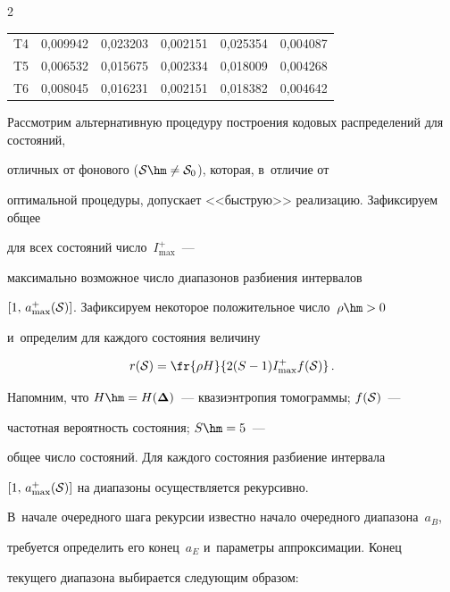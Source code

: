 \begin{multicols}{2}
\begin{table}
\begin{center}
\begin{tabular}{|c|c|c|c|c|c|}
T4 & 0,009942 & 0,023203 & 0,002151 & 0,025354 & 0,004087\\


T5 & 0,006532 & 0,015675 & 0,002334 & 0,018009 & 0,004268\\


T6 & 0,008045 & 0,016231 & 0,002151 & 0,018382 & 0,004642\\

\hline

\end{tabular}

\end{center}

\end{table}



Рассмотрим альтернативную процедуру построения кодовых распределений для состояний, 

отличных от фонового (${\cal S}\hm\neq {\cal S}_0$), которая, в~отличие от 

оптимальной процедуры, допускает <<быструю>> реализацию. Зафиксируем общее 

для всех со\-сто\-яний число~$I_{\max}^+$~--- 

максимально возможное число диапазонов разбиения интервалов 

$[1,\,a_{\max}^+({\cal S})]$. Зафиксируем некоторое положительное число~$\rho\hm> 0$ 

и~определим для каждого состояния величину

$$

r({\cal S}) = \fr{\rho H}{2( S-1) I_{\max}^+ f({\cal S})}\,.

$$

Напомним, что $H\hm=H(\boldsymbol{\Delta})$~--- квазиэнтропия томограммы; $f(\cal S)$~--- 

частотная вероятность состояния; $S\hm=5$~--- 

общее число состояний. Для каждого состояния разбиение интервала 

$[1,\,a_{\max}^+({\cal S})]$ на диапазоны осуществляется рекурсивно. 

В~начале очередного шага рекурсии известно начало очередного диапазона~$a_B$,

 требуется определить его конец~$a_E$ и~параметры аппроксимации. Конец 

 текущего диапазона выбирается следующим образом:


\end{multicols}
